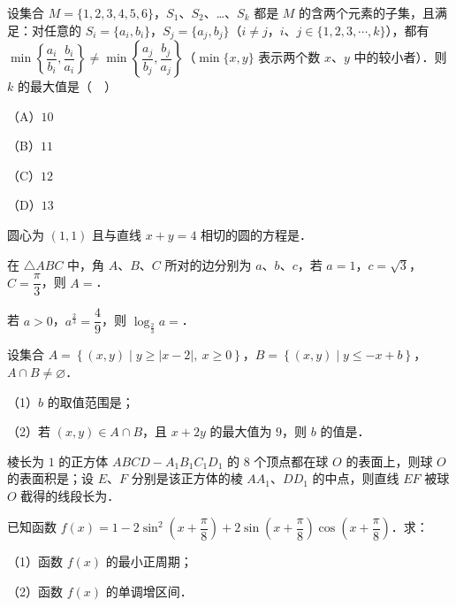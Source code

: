 \begin{question}
设集合 $M=\{1,2,3,4,5,6\}$，$S_1$、$S_2$、…、$S_k$ 都是 $M$ 的含两个元素的子集，且满足：对任意的 $S_i=\{a_i,b_i\}$，$S_j=\{a_j,b_j\}$（$i\neq j$，$i$、$j\in\{1,2,3,\cdots,k\}$），都有 $\min\left\{\dfrac{a_i}{b_i},\dfrac{b_i}{a_i}\right\}\neq\min\left\{\dfrac{a_j}{b_j},\dfrac{b_j}{a_j}\right\}$（$\min\{x,y\}$ 表示两个数 $x$、$y$ 中的较小者）．则 $k$ 的最大值是（　）

（A）$10$

（B）$11$

（C）$12$

（D）$13$

\end{question}

\begin{question}
圆心为 $(1,1)$ 且与直线 $x+y=4$ 相切的圆的方程是\gkblank{}．

\end{question}
\begin{question}
在 $\triangle ABC$ 中，角 $A$、$B$、$C$ 所对的边分别为 $a$、$b$、$c$，若 $a=1$，$c=\sqrt3$，$C=\dfrac{\pi}{3}$，则 $A=$\gkblank{}．

\end{question}
\begin{question}
若 $a>0$，$a^{\frac23}=\dfrac49$，则 $\log_{\frac23}a=$\gkblank{}．

\end{question}
\begin{question}
设集合 $A=\left\{(x,y)\mid y\geqslant|x-2|,\ x\geqslant0\right\}$，$B=\left\{(x,y)\mid y\leqslant-x+b\right\}$，$A\cap B\neq\varnothing$．

（1）$b$ 的取值范围是\gkblank{}；

（2）若 $(x,y)\in A\cap B$，且 $x+2y$ 的最大值为 $9$，则 $b$ 的值是\gkblank{}．

\end{question}
\begin{question}
棱长为 $1$ 的正方体 $ABCD-A_1B_1C_1D_1$ 的 $8$ 个顶点都在球 $O$ 的表面上，则球 $O$ 的表面积是\gkblank{}；设 $E$、$F$ 分别是该正方体的棱 $AA_1$、$DD_1$ 的中点，则直线 $EF$ 被球 $O$ 截得的线段长为\gkblank{}．

\end{question}
\begin{question}
已知函数 $f(x)=1-2\sin^2\left(x+\dfrac{\pi}{8}\right)+2\sin\left(x+\dfrac{\pi}{8}\right)\cos\left(x+\dfrac{\pi}{8}\right)$．求：

（1）函数 $f(x)$ 的最小正周期；

（2）函数 $f(x)$ 的单调增区间．

\end{question}

